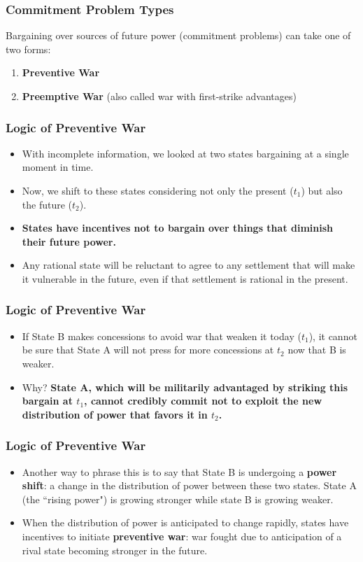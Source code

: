 \documentclass[handout]{beamer}
\begin{document}
\begin{frame} 
	\frametitle{\LARGE{Commitment Problem Types}}
	Bargaining over sources of future power (commitment problems) can take one of two forms:
	\begin{enumerate}
		\item \textbf{Preventive War} 
		\item\textbf{Preemptive War} (also called war with first-strike advantages)
	\end{enumerate}

\end{frame}

\begin{frame} 
	\frametitle{\LARGE{Logic of Preventive War}}
	\begin{itemize}
		\item With incomplete information, we looked at two states bargaining at a single moment in time. 
		\item Now, we shift to these states considering not only the present ($t_1$) but also the future ($t_2$). \pause
		\item \textbf{States have incentives not to bargain over things that diminish their future power.} \pause 
		\item Any rational state will be reluctant to agree to any settlement that will make it vulnerable in the future, even if that settlement is rational in the present.  
	\end{itemize}
\end{frame}

\begin{frame} 
	\frametitle{\LARGE{Logic of Preventive War}}
	\begin{itemize}
		\item If State B makes concessions to avoid war that weaken it today ($t_1$), it cannot be sure that State A will not press for more concessions at $t_2$ now that B is weaker. \pause
		\item Why? \textbf{State A, which will be militarily advantaged by striking this bargain at $t_1$, cannot credibly commit not to exploit the new distribution of power that favors it in $t_2$.}
	\end{itemize}
\end{frame}

\begin{frame} 
	\frametitle{\LARGE{Logic of Preventive War}}
	\begin{itemize}
		\item Another way to phrase this is to say that State B is undergoing a \textbf{power shift}: a  change in the distribution of power between these two states. State A (the ``rising power") is growing stronger while state B is growing weaker. \pause
		\item When the distribution of power is anticipated to change rapidly, states have incentives to initiate \textbf{preventive war}: war fought due to anticipation of a rival state becoming stronger in the future.  
	\end{itemize}
\end{frame}
\end{document}
